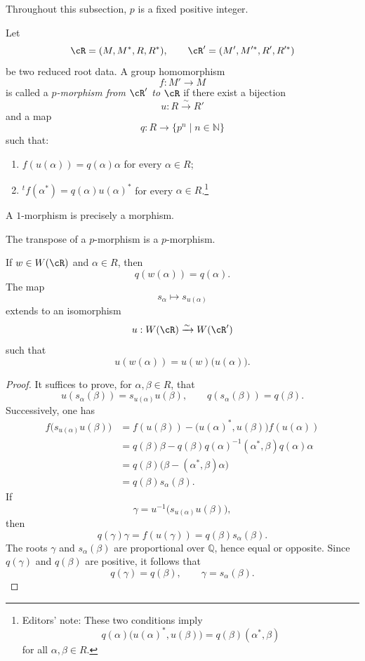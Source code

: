 Throughout this subsection, \(p\) is a fixed positive integer.

\begin{definition}\label{sga3:XXI:6.8.1}
Let
\[
 \cR=(M,M^\ast,R,R^\ast),
 \qquad
 \cR'=(M',M'^\ast,R',R'^\ast)
\]
be two reduced root data. A group homomorphism
\[
 f:M'\longrightarrow M
\]
is called a \emph{\(p\)-morphism from \(\cR'\) to \(\cR\)} if
there exist a bijection
\[
 u:R\xrightarrow{\sim}R'
\]
and a map
\[
 q:R\longrightarrow\{p^n\mid n\in\mathbb N\}
\]
such that:
\begin{enumerate}
\item[(i)] \(f(u(\alpha))=q(\alpha)\alpha\) for every
  \(\alpha\in R\);
\item[(ii)] \({}^tf(\alpha^\ast)=q(\alpha)u(\alpha)^\ast\) for
  every \(\alpha\in R\).\footnote{Editors' note: These two
  conditions imply
  \[
   q(\alpha)\bigl(u(\alpha)^\ast,u(\beta)\bigr)
   =q(\beta)(\alpha^\ast,\beta)
  \]
  for all \(\alpha,\beta\in R\).}
\end{enumerate}
\end{definition}

\begin{corollary}\label{sga3:XXI:6.8.2}
A \(1\)-morphism is precisely a morphism.
\end{corollary}

\begin{corollary}\label{sga3:XXI:6.8.3}
The transpose of a \(p\)-morphism is a \(p\)-morphism.
\end{corollary}

\begin{lemma}\label{sga3:XXI:6.8.4}
If \(w\in W(\cR)\) and \(\alpha\in R\), then
\[
 q(w(\alpha))=q(\alpha).
\]
The map
\[
 s_\alpha\longmapsto s_{u(\alpha)}
\]
extends to an isomorphism
\[
 u:W(\cR)\xrightarrow{\sim}W(\cR')
\]
such that
\[
 u(w(\alpha))=u(w)\bigl(u(\alpha)\bigr).
\]
\end{lemma}

\begin{proof}
It suffices to prove, for \(\alpha,\beta\in R\), that
\[
 u(s_\alpha(\beta))=s_{u(\alpha)}u(\beta),
 \qquad
 q(s_\alpha(\beta))=q(\beta).
\]
Successively, one has
\begin{align*}
 f\bigl(s_{u(\alpha)}u(\beta)\bigr)
  &=f(u(\beta))
    -\bigl(u(\alpha)^\ast,u(\beta)\bigr)f(u(\alpha))\\
  &=q(\beta)\beta
    -q(\beta)q(\alpha)^{-1}
       (\alpha^\ast,\beta)q(\alpha)\alpha\\
  &=q(\beta)\bigl(\beta-(\alpha^\ast,\beta)\alpha\bigr)\\
  &=q(\beta)s_\alpha(\beta).
\end{align*}
If
\[
 \gamma=u^{-1}\bigl(s_{u(\alpha)}u(\beta)\bigr),
\]
then
\[
 q(\gamma)\gamma=f(u(\gamma))=q(\beta)s_\alpha(\beta).
\]
The roots \(\gamma\) and \(s_\alpha(\beta)\) are proportional over
\(\mathbb Q\), hence equal or opposite. Since \(q(\gamma)\) and
\(q(\beta)\) are positive, it follows that
\[
 q(\gamma)=q(\beta),
 \qquad
 \gamma=s_\alpha(\beta).
\]
\end{proof}

